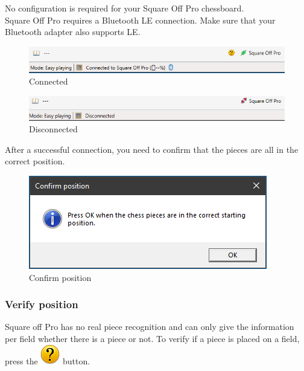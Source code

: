 \documentclass[11pt,a4paper]{article}
\begin{document}
No configuration is required for your Square Off Pro chessboard.\\
Square Off Pro requires a Bluetooth LE connection. Make sure that your Bluetooth adapter also supports LE.

\begin{figure}[H]
	\centering
	\includegraphics[scale=0.8]{SquareOffPro2.png}
	\caption{Connected}
	\label{fig:SquareOffPro2}
\end{figure}

\begin{figure}[H]
	\centering
	\includegraphics[scale=0.8]{SquareOffPro3.png}
	\caption{Disconnected}
	\label{fig:SquareOffPro3}
\end{figure}

After a successful connection, you need to confirm that the pieces are all in the correct position.

\begin{figure}[H]
	\centering
	\includegraphics[scale=0.8]{Pegasus4.png}
	\caption{Confirm position}
	\label{fig:SquareOffPro4}
\end{figure}

\subsubsection{Verify position} \label{VerifyPegasusPosition}
Square off Pro has no real piece recognition and can only give the information per field whether there is a piece or not. To verify if a piece is placed on a field, press the  \includegraphics[scale=0.4]{emotion_question.png} button.
\end{document}
